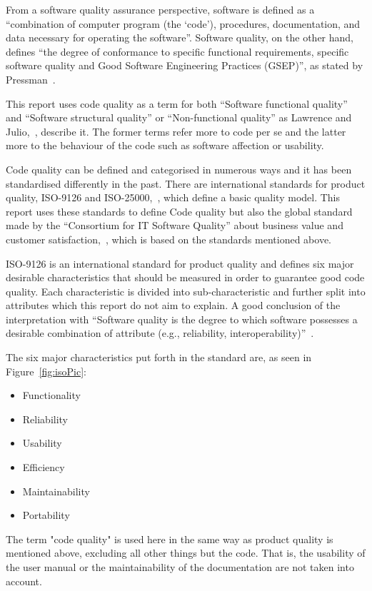 From a software quality assurance perspective, software is defined  as a ``combination of computer program (the `code'), procedures, documentation, and data necessary for operating the software''\cite{Galin}. Software quality, on the other hand, defines ``the degree of conformance to specific functional requirements, specific software quality and Good Software Engineering Practices (GSEP)'', as stated by Pressman~\cite{Pressman}. 

This report uses code quality as a term for both ``Software functional quality'' and ``Software structural quality'' or ``Non-functional quality'' as Lawrence and Julio,~\cite{Chung}, describe it. The former terms refer more to code per se and the latter more to the behaviour of the code such as software affection or usability. 

Code quality can be defined and categorised in numerous ways and it has been standardised differently in the past. There are international standards for product quality, ISO-9126 and ISO-25000,~\cite{ISO9126}, which define a basic quality model. This report uses these standards to define Code quality but also the global standard made by the ``Consortium for IT Software Quality'' about business value and customer satisfaction,~\cite{cisq}, which is based on the standards mentioned above. 

ISO-9126 is an international standard for product quality and defines six major desirable characteristics that should be measured in order to guarantee good code quality. Each characteristic is divided into sub-characteristic and further split into attributes which this report do not aim to explain. A good conclusion of the interpretation with 
``Software quality is the degree to which software possesses a desirable combination of attribute (e.g., reliability, interoperability)''~\cite{ISO1061}. 

The six major characteristics put forth in the standard are, as seen in Figure~\ref{fig:isoPic}: 
\begin{itemize}
\item Functionality 
\item Reliability
\item Usability
\item Efficiency
\item Maintainability
\item Portability
\end{itemize}

The term "code quality" is used here in the same way as product quality is mentioned above, excluding all other things but the code. That is, the usability of the user manual or the maintainability of the documentation are not taken into account.  
